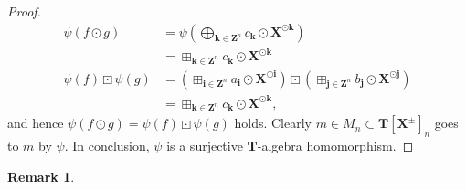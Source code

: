 \documentclass[a4paper,12pt]{amsart}
\newtheorem{rem}[dfn]{Remark}
\begin{document}
\begin{proof}
\begin{align*}
\psi(f \odot g) &= \psi \left( \bigoplus_{\boldsymbol{k} \in \boldsymbol{Z}^n} c_{\boldsymbol{k}} \odot \boldsymbol{X}^{\odot \boldsymbol{k}} \right)\\
&= \boxplus_{\boldsymbol{k} \in \boldsymbol{Z}^n} c_{\boldsymbol{k}} \odot \boldsymbol{X}^{\odot \boldsymbol{k}}\\
\psi(f) \boxdot \psi(g) &= \left( \boxplus_{\boldsymbol{i} \in \boldsymbol{Z}^n} a_{\boldsymbol{i}} \odot \boldsymbol{X}^{\odot \boldsymbol{i}} \right) \boxdot \left( \boxplus_{\boldsymbol{j} \in \boldsymbol{Z}^n} b_{\boldsymbol{j}} \odot \boldsymbol{X}^{\odot \boldsymbol{j}} \right)\\
&= \boxplus_{\boldsymbol{k} \in \boldsymbol{Z}^n} c_{\boldsymbol{k}} \odot \boldsymbol{X}^{\odot \boldsymbol{k}},
\end{align*}
and hence $\psi(f \odot g) = \psi(f) \boxdot \psi(g)$ holds.
Clearly $m \in M_n \subset \boldsymbol{T}[\boldsymbol{X}^{\pm}]_n$ goes to $m$ by $\psi$.
In conclusion, $\psi$ is a surjective $\boldsymbol{T}$-algebra homomorphism.
\end{proof}

\begin{rem}
    \label{rem4-6-1}
\end{rem}
\end{document}
